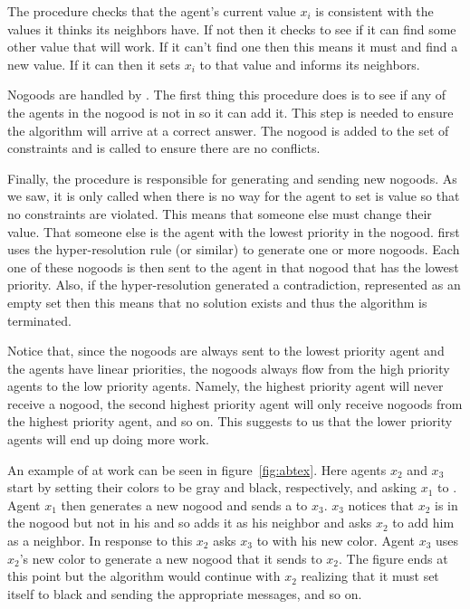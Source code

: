 The procedure  checks that the agent's current
value $x_i$ is consistent with the values it thinks its neighbors
have. If not then it checks to see if it can find some other value
that will work. If it can't find one then this means it must
 and find a new value. If it can then it sets $x_i$ to
that value and informs its neighbors.

Nogoods are handled by . The first thing this
procedure does is to see if any of the agents in the nogood is not in
 so it can add it. This step is needed to ensure the
algorithm will arrive at a correct answer. The nogood is added to the
set of constraints and  is called to ensure
there are no conflicts.

Finally, the  procedure is responsible for generating
and sending new nogoods. As we saw, it is only called when there is no
way for the agent to set is value so that no constraints are violated.
This means that someone else must change their value. That someone
else is the agent with the lowest priority in the nogood.
 first uses the hyper-resolution rule (or similar) to
generate one or more nogoods. Each one of
these nogoods is then sent to the agent in that nogood that has the
lowest priority. Also, if the hyper-resolution generated a
contradiction, represented as an empty set then this means that no
solution exists and thus the algorithm is terminated.

Notice that, since the nogoods are always sent to the lowest priority
agent and the agents have linear priorities, the nogoods always flow
from the high priority agents to the low priority agents. Namely, the
highest priority agent will never receive a nogood, the second highest
priority agent will only receive nogoods from the highest priority
agent, and so on.  This suggests to us that the lower priority agents
will end up doing more work.

 An example of  at work can be seen in
figure~\ref{fig:abtex}. Here agents $x_2$ and $x_3$ start by setting
their colors to be gray and black, respectively, and asking $x_1$ to
. Agent $x_1$ then generates a new nogood and sends a
 to $x_3$. $x_3$ notices that $x_2$ is in the nogood but
not in his  and so adds it as his neighbor and asks
$x_2$ to add him as a neighbor. In response to this $x_2$ asks $x_3$
to  with his new color. Agent $x_3$ uses $x_2$'s new
color to generate a new nogood that it sends to $x_2$. The figure ends
at this point but the algorithm would continue with $x_2$ realizing
that it must set itself to black and sending the appropriate
 messages, and so on.

